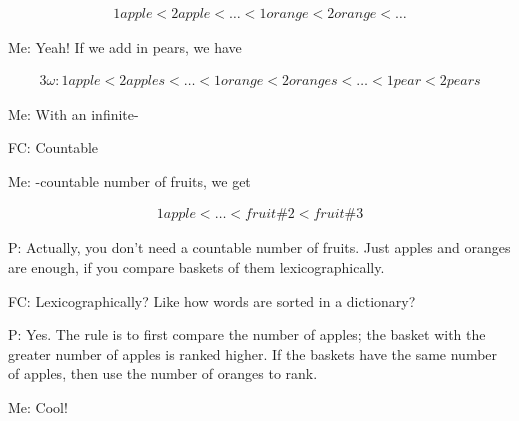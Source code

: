 \documentclass[a4paper,12pt]{article}
\begin{document}
\begin{align*}
1 apple < 2 apple < \ldots < 1 orange < 2 orange < \ldots
\end{align*}

Me: Yeah! If we add in pears, we have

\begin{align*}
3\omega: 1 apple < 2 apples < \ldots < 1 orange < 2 oranges < \ldots < 1 pear < 2 pears
\end{align*}

Me: With an infinite-

FC: Countable

Me: -countable number of fruits, we get

\begin{align*}
1 apple < \ldots < fruit \#2 < fruit \#3
\end{align*}

P: Actually, you don't need a countable number of fruits. Just apples and oranges are enough, if you compare baskets of them lexicographically.

FC: Lexicographically? Like how words are sorted in a dictionary?

P: Yes. The rule is to first compare the number of apples; the basket with the greater number of apples is ranked higher. If the baskets have the same number of apples, then use the number of oranges to rank.

Me: Cool!
\end{document}
